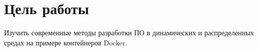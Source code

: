 \thispagestyle{empty}
\section*{Цель работы}

Изучить  современные  методы  разработки  ПО  в  динамических  и распределенных средах на примере контейнеров Docker. 